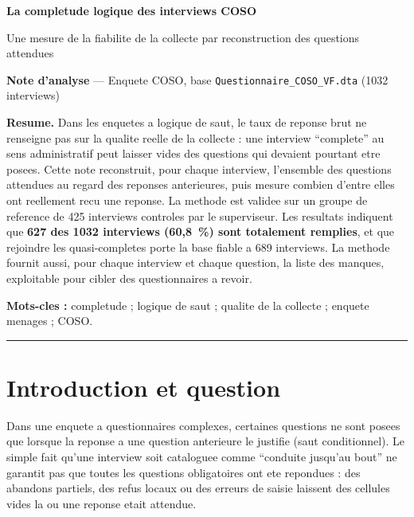 \documentclass[11pt,a4paper]{article}
\begin{document}
\begin{center}
  {\LARGE\bfseries La completude logique des interviews COSO\par}
  \vspace{0.5em}
  {\normalsize Une mesure de la fiabilite de la collecte par reconstruction
            des questions attendues\par}
  \vspace{1.2em}
  {\normalsize \textbf{Note d'analyse} --- Enquete COSO, base
            \texttt{Questionnaire\_COSO\_VF.dta} (1032 interviews)\par}
\end{center}
\vspace{1.2em}

\noindent\begin{minipage}{\textwidth}
\textbf{Resume.} Dans les enquetes a logique de saut, le taux de reponse
brut ne renseigne pas sur la qualite reelle de la collecte : une interview
``complete'' au sens administratif peut laisser vides des questions qui
devaient pourtant etre posees. Cette note reconstruit, pour chaque
interview, l'ensemble des questions attendues au regard des reponses
anterieures, puis mesure combien d'entre elles ont reellement recu une
reponse. La methode est validee sur un groupe de reference de
425 interviews controles par le superviseur. Les resultats indiquent que
\textbf{627 des 1032 interviews (60,8~\%) sont totalement remplies}, et que
rejoindre les quasi-completes porte la base fiable a 689 interviews.
La methode fournit aussi, pour chaque interview et chaque question, la
liste des manques, exploitable pour cibler des questionnaires a revoir.

\vspace{0.4em}
\textbf{Mots-cles :} completude ; logique de saut ; qualite de la collecte ;
enquete menages ; COSO.
\end{minipage}

\vspace{1.2em}
\hrule
\vspace{1.2em}

\section{Introduction et question}

Dans une enquete a questionnaires complexes, certaines questions ne sont
posees que lorsque la reponse a une question anterieure le justifie
(saut conditionnel). Le simple fait qu'une interview soit cataloguee comme
``conduite jusqu'au bout'' ne garantit pas que toutes les questions
obligatoires ont ete repondues : des abandons partiels, des refus locaux ou
des erreurs de saisie laissent des cellules vides la ou une reponse etait
attendue.
\end{document}
